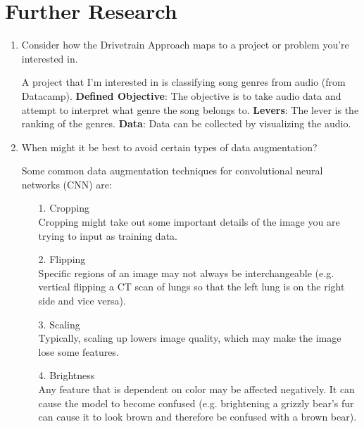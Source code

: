 \documentclass[12pt,a4paper]{article}
\begin{document}
\section*{Further Research}

\begin{enumerate}
\item Consider how the Drivetrain Approach maps to a project or problem you're interested in. \\

\smallbreak

A project that I'm interested in is classifying song genres from audio (from Datacamp).
\smallbreak
\textbf{Defined Objective}: The objective is to take audio data and attempt to interpret what genre the song belongs to.
\smallbreak
\textbf{Levers}: The lever is the ranking of the genres.
\smallbreak
\textbf{Data}: Data can be collected by visualizing the audio.

\bigbreak

\item When might it be best to avoid certain types of data augmentation? \\

\smallbreak

Some common data augmentation techniques for convolutional neural networks (CNN) are:
\begin{itemize}
\item[1.] Cropping \\
\smallbreak
Cropping might take out some important details of the image you are trying to input as training data.

\item[2.] Flipping \\
\smallbreak
Specific regions of an image may not always be interchangeable (e.g. vertical flipping a CT scan of lungs so that the left lung is on the right side and vice versa).

\item[3.] Scaling \\
\smallbreak
Typically, scaling up lowers image quality, which may make the image lose some features.

\item[4.] Brightness \\
\smallbreak
Any feature that is dependent on color may be affected negatively. It can cause the model to become confused (e.g. brightening a grizzly bear's fur can cause it to look brown and therefore be confused with a brown bear).


\end{itemize}
\end{enumerate}
\end{document}
